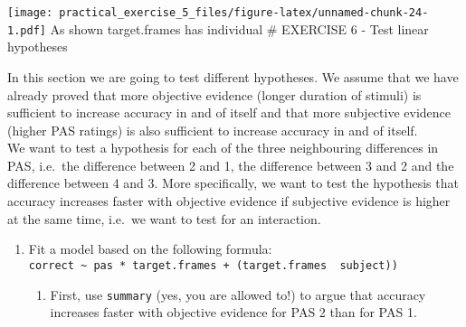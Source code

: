 \documentclass[
]{article}
\providecommand{\tightlist}{%
  \setlength{\itemsep}{0pt}\setlength{\parskip}{0pt}}
\begin{document}
\texttt{[image: practical\_exercise\_5\_files/figure-latex/unnamed-chunk-24-1.pdf]}
As shown target.frames has individual \# EXERCISE 6 - Test linear
hypotheses

In this section we are going to test different hypotheses. We assume
that we have already proved that more objective evidence (longer
duration of stimuli) is sufficient to increase accuracy in and of itself
and that more subjective evidence (higher PAS ratings) is also
sufficient to increase accuracy in and of itself.\\
We want to test a hypothesis for each of the three neighbouring
differences in PAS, i.e.~the difference between 2 and 1, the difference
between 3 and 2 and the difference between 4 and 3. More specifically,
we want to test the hypothesis that accuracy increases faster with
objective evidence if subjective evidence is higher at the same time,
i.e.~we want to test for an interaction.

\begin{enumerate}
\def\labelenumi{\arabic{enumi})}
\tightlist
\item
  Fit a model based on the following formula:
  \texttt{correct\ \textasciitilde{}\ pas\ *\ target.frames\ +\ (target.frames\ \textbar{}\ subject))}

  \begin{enumerate}
  \def\labelenumii{\roman{enumii}.}
  \tightlist
  \item
    First, use \texttt{summary} (yes, you are allowed to!) to argue that
    accuracy increases faster with objective evidence for PAS 2 than for
    PAS 1.
  \end{enumerate}
\end{enumerate}
\end{document}
